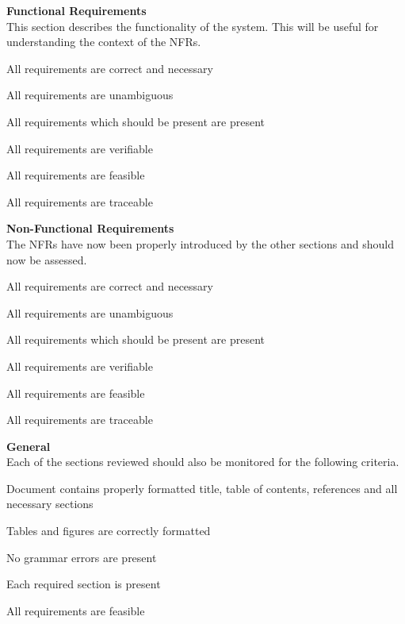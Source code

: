 \documentclass[12pt, titlepage]{article}
\begin{document}
\textbf{Functional Requirements}\\
This section describes the functionality of the system. This will be useful for understanding the context of the NFRs.
\begin{todolist}
\item All requirements are correct and necessary
\item All requirements are unambiguous
\item All requirements which should be present are present
\item All requirements are verifiable
\item All requirements are feasible
\item All requirements are traceable
\end{todolist}
\textbf{Non-Functional Requirements}\\
The NFRs have now been properly introduced by the other sections and should now be assessed.
\begin{todolist}
  \item All requirements are correct and necessary
  \item All requirements are unambiguous
  \item All requirements which should be present are present
  \item All requirements are verifiable
  \item All requirements are feasible
  \item All requirements are traceable
  \end{todolist}
\textbf{General}\\
Each of the sections reviewed should also be monitored for the following criteria.
\begin{todolist}
  \item Document contains properly formatted title, table of contents, references and all necessary sections
  \item Tables and figures are correctly formatted
  \item No grammar errors are present
  \item Each required section is present
  \item All requirements are feasible
  \end{todolist}


\end{document}
